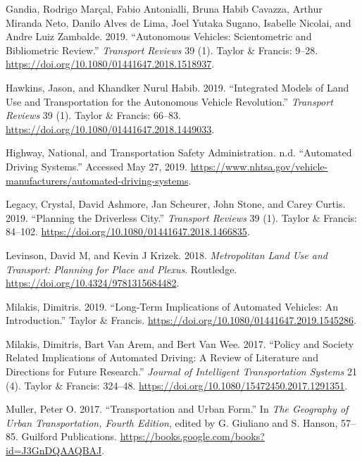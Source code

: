 \documentclass[12pt,]{article}
\begin{document}
\leavevmode\hypertarget{ref-gandia2019autonomous}{}%
Gandia, Rodrigo Marçal, Fabio Antonialli, Bruna Habib Cavazza, Arthur
Miranda Neto, Danilo Alves de Lima, Joel Yutaka Sugano, Isabelle
Nicolai, and Andre Luiz Zambalde. 2019. ``Autonomous Vehicles:
Scientometric and Bibliometric Review.'' \emph{Transport Reviews} 39
(1). Taylor \& Francis: 9--28.
\url{https://doi.org/10.1080/01441647.2018.1518937}.

\leavevmode\hypertarget{ref-hawkins2019integrated}{}%
Hawkins, Jason, and Khandker Nurul Habib. 2019. ``Integrated Models of
Land Use and Transportation for the Autonomous Vehicle Revolution.''
\emph{Transport Reviews} 39 (1). Taylor \& Francis: 66--83.
\url{https://doi.org/10.1080/01441647.2018.1449033}.

\leavevmode\hypertarget{ref-NHTSA2019ADS}{}%
Highway, National, and Transportation Safety Administration. n.d.
``Automated Driving Systems.'' Accessed May 27, 2019.
\url{https://www.nhtsa.gov/vehicle-manufacturers/automated-driving-systems}.

\leavevmode\hypertarget{ref-legacy2019planning}{}%
Legacy, Crystal, David Ashmore, Jan Scheurer, John Stone, and Carey
Curtis. 2019. ``Planning the Driverless City.'' \emph{Transport Reviews}
39 (1). Taylor \& Francis: 84--102.
\url{https://doi.org/10.1080/01441647.2018.1466835}.

\leavevmode\hypertarget{ref-levinson2018metropolitan}{}%
Levinson, David M, and Kevin J Krizek. 2018. \emph{Metropolitan Land Use
and Transport: Planning for Place and Plexus}. Routledge.
\url{https://doi.org/10.4324/9781315684482}.

\leavevmode\hypertarget{ref-milakis2019long}{}%
Milakis, Dimitris. 2019. ``Long-Term Implications of Automated Vehicles:
An Introduction.'' Taylor \& Francis.
\url{https://doi.org/10.1080/01441647.2019.1545286}.

\leavevmode\hypertarget{ref-milakis2017policy}{}%
Milakis, Dimitris, Bart Van Arem, and Bert Van Wee. 2017. ``Policy and
Society Related Implications of Automated Driving: A Review of
Literature and Directions for Future Research.'' \emph{Journal of
Intelligent Transportation Systems} 21 (4). Taylor \& Francis: 324--48.
\url{https://doi.org/10.1080/15472450.2017.1291351}.

\leavevmode\hypertarget{ref-Muller2017transportation}{}%
Muller, Peter O. 2017. ``Transportation and Urban Form.'' In \emph{The
Geography of Urban Transportation, Fourth Edition}, edited by G.
Giuliano and S. Hanson, 57--85. Guilford Publications.
\url{https://books.google.com/books?id=J3GnDQAAQBAJ}.
\end{document}
